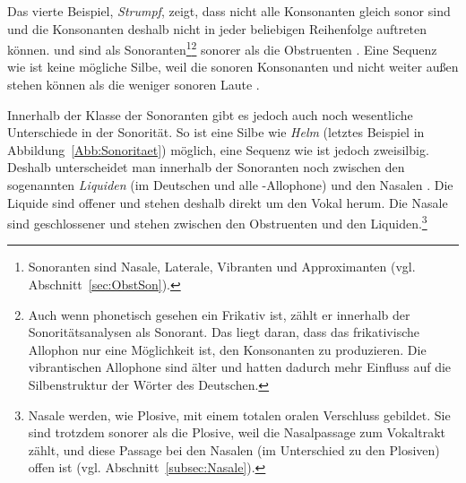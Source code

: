 Das vierte Beispiel, \textit{Strumpf}, zeigt, dass nicht alle Konsonanten gleich sonor sind und die Konsonanten deshalb nicht in jeder beliebigen Reihenfolge auftreten können. \textipa{[K]} und \textipa{[m]} sind als Sonoranten\footnote{Sonoranten sind Nasale, Laterale, Vibranten und Approximanten (vgl. Abschnitt~\ref{sec:ObstSon}).}\footnote{Auch wenn \textipa{[K]} phonetisch gesehen ein Frikativ ist, zählt er innerhalb der Sonoritätsanalysen als Sonorant. Das liegt daran, dass das frikativische Allophon \textipa{[K]} nur eine Möglichkeit ist, den Konsonanten zu produzieren. Die vibrantischen Allophone \textipa{[r, \;R]} sind älter und hatten dadurch mehr Einfluss auf die Silbenstruktur der Wörter des Deutschen.} sonorer als die Obstruenten \textipa{[S, t, \t{pf}]}. Eine Sequenz wie \textipa{[KStU\t{pf}m]} ist keine mögliche Silbe, weil die sonoren Konsonanten \textipa{[K]} und \textipa{[m]} nicht weiter außen stehen können als die weniger sonoren Laute \textipa{[S, t, \t{pf}]}.

Innerhalb der Klasse der Sonoranten gibt es jedoch auch noch wesentliche Unterschiede in der Sonorität. So ist eine Silbe wie \textit{Helm} \textipa{[hElm]} (letztes Beispiel in Abbildung~\ref{Abb:Sonoritaet}) möglich, eine Sequenz wie \textipa{[hEml]} ist jedoch zweisilbig. Deshalb unterscheidet man innerhalb der Sonoranten noch zwischen den sogenannten \textit{Liquiden} (im Deutschen  und alle -Allophone) und den Nasalen . Die Liquide sind offener und stehen deshalb direkt um den Vokal herum. Die Nasale sind geschlossener und stehen zwischen den Obstruenten und den Liquiden.\footnote{Nasale werden, wie Plosive, mit einem totalen oralen Verschluss gebildet. Sie sind trotzdem sonorer als die Plosive, weil die Nasalpassage zum Vokaltrakt zählt, und diese Passage bei den Nasalen (im Unterschied zu den Plosiven) offen ist (vgl. Abschnitt~\ref{subsec:Nasale}).}

